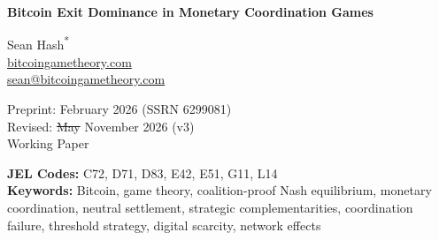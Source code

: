 \documentclass[12pt]{article}
\theoremstyle{definition}
\theoremstyle{remark}
\providecommand{\DIFaddtex}[1]{{\color{AddedText}#1}}
\providecommand{\DIFdeltex}[1]{{\color{DeletedText}\sout{#1}}}
\providecommand{\DIFaddbegin}{}
\providecommand{\DIFaddend}{}
\providecommand{\DIFdelbegin}{}
\providecommand{\DIFdelend}{}
\providecommand{\DIFadd}[1]{\texorpdfstring{\DIFaddtex{#1}}{#1}} %
\providecommand{\DIFdel}[1]{\texorpdfstring{\DIFdeltex{#1}}{}} %
\begin{document}
\thispagestyle{firstpage}


\begin{center}
{\LARGE\bfseries Bitcoin Exit Dominance in Monetary Coordination Games}

\bigskip

{\large Sean Hash\textsuperscript{*}}\\
\url{bitcoingametheory.com}\\
\href{mailto:sean@bitcoingametheory.com}{sean@bitcoingametheory.com}

\bigskip

Preprint: February 2026 (SSRN 6299081)\\
Revised: \DIFdelbegin \DIFdel{May }\DIFdelend \DIFaddbegin \DIFadd{November }\DIFaddend 2026 \DIFaddbegin \DIFadd{(v3)}\DIFaddend \\[4pt]
{\normalsize Working Paper}

\medskip

{\small
\textbf{JEL Codes:} C72, D71, D83, E42, E51, G11, L14\\[4pt]
\textbf{Keywords:} Bitcoin, game theory, coalition-proof Nash equilibrium, monetary coordination, neutral settlement, strategic complementarities, coordination failure, threshold strategy, digital scarcity, network effects
}
\end{center}

\bigskip

\end{document}
